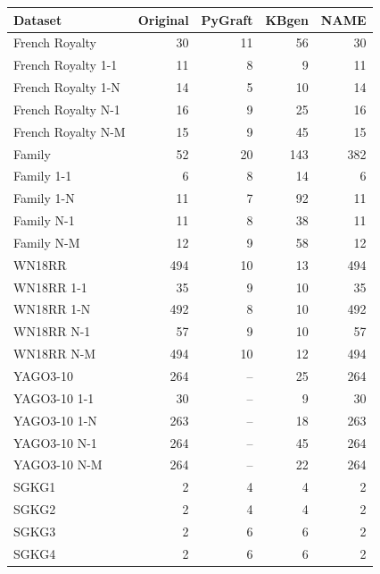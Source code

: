 \begin{tabular}{lrrrr}
\toprule
Dataset & Original & PyGraft & KBgen & NAME \\
\midrule
French Royalty & 30 & 11 & 56 & 30 \\
French Royalty 1-1 & 11 & 8 & 9 & 11 \\
French Royalty 1-N & 14 & 5 & 10 & 14 \\
French Royalty N-1 & 16 & 9 & 25 & 16 \\
French Royalty N-M & 15 & 9 & 45 & 15 \\
\midrule
Family & 52 & 20 & 143 & 382 \\
Family 1-1 & 6 & 8 & 14 & 6 \\
Family 1-N & 11 & 7 & 92 & 11 \\
Family N-1 & 11 & 8 & 38 & 11 \\
Family N-M & 12 & 9 & 58 & 12 \\
\midrule
WN18RR & 494 & 10 & 13 & 494 \\
WN18RR 1-1 & 35 & 9 & 10 & 35 \\
WN18RR 1-N & 492 & 8 & 10 & 492 \\
WN18RR N-1 & 57 & 9 & 10 & 57 \\
WN18RR N-M & 494 & 10 & 12 & 494 \\
\midrule
YAGO3-10 & 264 & – & 25 & 264 \\
YAGO3-10 1-1 & 30 & – & 9 & 30 \\
YAGO3-10 1-N & 263 & – & 18 & 263 \\
YAGO3-10 N-1 & 264 & – & 45 & 264 \\
YAGO3-10 N-M & 264 & – & 22 & 264 \\
\midrule
SGKG1 & 2 & 4 & 4 & 2 \\
SGKG2 & 2 & 4 & 4 & 2 \\
SGKG3 & 2 & 6 & 6 & 2 \\
SGKG4 & 2 & 6 & 6 & 2 \\
\bottomrule
\end{tabular}
